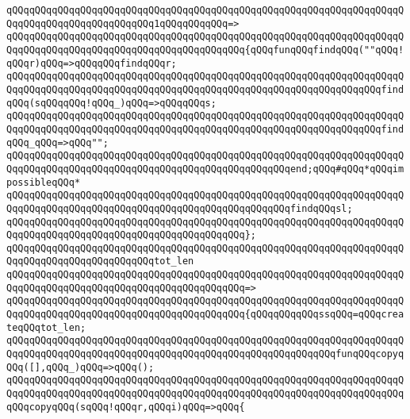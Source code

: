 \newline
\verb|qQQqqQQqqQQqqQQqqQQqqQQqqQQqqQQqqQQqqQQqqQQqqQQqqQQqqQQqqQQqqQQqqQQqqQQqqQQqqQQqqQQqqQQqqQQqqQQq1qQQqqQQqqQQq=>|\newline
\verb|qQQqqQQqqQQqqQQqqQQqqQQqqQQqqQQqqQQqqQQqqQQqqQQqqQQqqQQqqQQqqQQqqQQqqQQqqQQqqQQqqQQqqQQqqQQqqQQqqQQqqQQqqQQqqQQq{qQQqfunqQQqfindqQQq(""qQQq!qQQqr)qQQq=>qQQqqQQqfindqQQqr;|\newline
\verb|qQQqqQQqqQQqqQQqqQQqqQQqqQQqqQQqqQQqqQQqqQQqqQQqqQQqqQQqqQQqqQQqqQQqqQQqqQQqqQQqqQQqqQQqqQQqqQQqqQQqqQQqqQQqqQQqqQQqqQQqqQQqqQQqqQQqqQQqfindqQQq(sqQQqqQQq!qQQq_)qQQq=>qQQqqQQqs;|\newline
\verb|qQQqqQQqqQQqqQQqqQQqqQQqqQQqqQQqqQQqqQQqqQQqqQQqqQQqqQQqqQQqqQQqqQQqqQQqqQQqqQQqqQQqqQQqqQQqqQQqqQQqqQQqqQQqqQQqqQQqqQQqqQQqqQQqqQQqqQQqfindqQQq_qQQq=>qQQq"";|\newline
\verb|qQQqqQQqqQQqqQQqqQQqqQQqqQQqqQQqqQQqqQQqqQQqqQQqqQQqqQQqqQQqqQQqqQQqqQQqqQQqqQQqqQQqqQQqqQQqqQQqqQQqqQQqqQQqqQQqqQQqqQQqend;qQQq#qQQq*qQQqimpossibleqQQq*|\newline
\newline
\verb|qQQqqQQqqQQqqQQqqQQqqQQqqQQqqQQqqQQqqQQqqQQqqQQqqQQqqQQqqQQqqQQqqQQqqQQqqQQqqQQqqQQqqQQqqQQqqQQqqQQqqQQqqQQqqQQqqQQqqQQqfindqQQqsl;|\newline
\verb|qQQqqQQqqQQqqQQqqQQqqQQqqQQqqQQqqQQqqQQqqQQqqQQqqQQqqQQqqQQqqQQqqQQqqQQqqQQqqQQqqQQqqQQqqQQqqQQqqQQqqQQqqQQqqQQq};|\newline
\newline
\verb|qQQqqQQqqQQqqQQqqQQqqQQqqQQqqQQqqQQqqQQqqQQqqQQqqQQqqQQqqQQqqQQqqQQqqQQqqQQqqQQqqQQqqQQqqQQqqQQqtot_len|\newline
\verb|qQQqqQQqqQQqqQQqqQQqqQQqqQQqqQQqqQQqqQQqqQQqqQQqqQQqqQQqqQQqqQQqqQQqqQQqqQQqqQQqqQQqqQQqqQQqqQQqqQQqqQQqqQQqqQQq=>|\newline
\verb|qQQqqQQqqQQqqQQqqQQqqQQqqQQqqQQqqQQqqQQqqQQqqQQqqQQqqQQqqQQqqQQqqQQqqQQqqQQqqQQqqQQqqQQqqQQqqQQqqQQqqQQqqQQqqQQq{qQQqqQQqqQQqssqQQq=qQQqcreateqQQqtot_len;|\newline
\newline
\verb|qQQqqQQqqQQqqQQqqQQqqQQqqQQqqQQqqQQqqQQqqQQqqQQqqQQqqQQqqQQqqQQqqQQqqQQqqQQqqQQqqQQqqQQqqQQqqQQqqQQqqQQqqQQqqQQqqQQqqQQqqQQqqQQqfunqQQqcopyqQQq([],qQQq_)qQQq=>qQQq();|\newline
\newline
\verb|qQQqqQQqqQQqqQQqqQQqqQQqqQQqqQQqqQQqqQQqqQQqqQQqqQQqqQQqqQQqqQQqqQQqqQQqqQQqqQQqqQQqqQQqqQQqqQQqqQQqqQQqqQQqqQQqqQQqqQQqqQQqqQQqqQQqqQQqqQQqqQQqcopyqQQq(sqQQq!qQQqr,qQQqi)qQQq=>qQQq{|\newline
